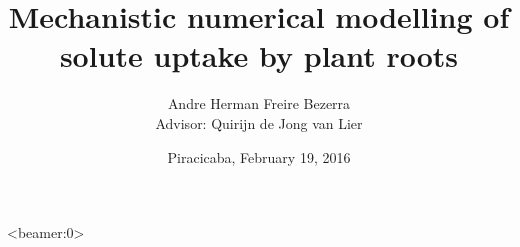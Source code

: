 \documentclass[compress]{beamer}  %
\title{Mechanistic numerical modelling of solute uptake by plant roots}
\author[Bezerra, A.H.F.]
{
Andre Herman Freire Bezerra\\
{\scriptsize Advisor: Quirijn de Jong van Lier}
}
\institute{University of S\~ao Paulo}
\date
{Piracicaba, February 19, 2016}
\begin{document}
\frame{\titlepage}

%
%
%







{\scriptsize 
}

\begin{frame}<beamer:0>		%

\end{frame}
\end{document}
